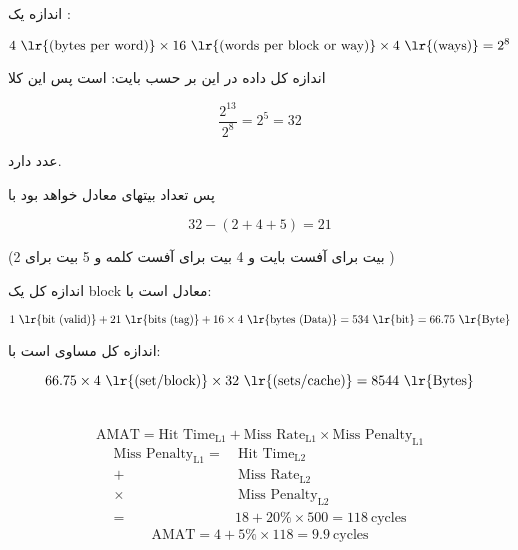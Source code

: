 \documentclass[11pt, dvipsnames, svgnames, x11names]{article}
\begin{document}
\section{}

اندازه یک
:
\begin{latin}
\[4 \ \text{\lr{(bytes per word)}} \times 16 \ \text{\lr{(words per block or way)}} \times 4 \ \text{\lr{(ways)}} = 2^8\]
\end{latin}

اندازه کل داده در این  بر حسب بایت:
است پس این 
کلا
\begin{latin}
\[\frac{2^{13}}{2^8} = 2^5 = 32\]
\end{latin}
 عدد 
دارد.

پس تعداد بیتهای  معادل خواهد بود با
\begin{latin}
\[32 - (2 + 4 + 5) = 21\]
\end{latin}
(2 بیت برای آفست بایت و 4 بیت برای آفست کلمه و 5 بیت برای )

\vspace{5mm}
اندازه کل یک block معادل است با:
\begin{latin}
\[1 \ \text{\lr{bit (valid)}} + 21 \ \text{\lr{bits (tag)}} + 16 \times 4 \ \text{\lr{bytes (Data)}} = 534 \ \text{\lr{bit}} = 66.75  \ \text{\lr{Byte}}\]
\end{latin}

اندازه کل  مساوی است با:
\begin{latin}
\[66.75 \times 4 \ \text{\lr{(set/block)}} \times 32 \ \text{\lr{(sets/cache)}} = 8544 \ \text{\lr{Bytes}}\]
\end{latin}
\section{}

\begin{latin}
\begin{equation}
\text{AMAT} = \text{Hit Time}_{\text{L1}} +\text{Miss Rate}_{\text{L1}} \times \text{Miss Penalty}_{\text{L1}}
\end{equation}
\begin{equation}
\begin{split}
\text{Miss Penalty}_{\text{L1}} = & \ \text{Hit Time}_{\text{L2}} \\
+ & \ \text{Miss Rate}_{\text{L2}} \\
\times & \ \text{Miss Penalty}_{\text{L2}} \\
= & 18 + 20 \% \times 500 = 118 \ \text{cycles}
\end{split}
\end{equation}
\begin{equation}
\text{AMAT} = 4 + 5\% \times 118 = 9.9 \ \text{cycles}
\end{equation}
\end{latin}
\end{document}
